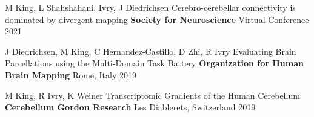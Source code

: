 \begin{cventries}

  \cventry
    {M King, L Shahshahani, Ivry, J Diedrichsen} %
    {Cerebro-cerebellar connectivity is dominated by divergent mapping} %
    {\textbf{Society for Neuroscience}} %
    {Virtual Conference} %
    {2021} %


  \cventry
    {J Diedrichsen, M King, C Hernandez-Castillo, D Zhi, R Ivry} %
    {Evaluating Brain Parcellations using the Multi-Domain Task Battery} %
    {\textbf{Organization for Human Brain Mapping}} %
    {Rome, Italy} %
    {2019} %
    
    
  \cventry
    {M King, R Ivry, K Weiner} %
    {Transcriptomic Gradients of the Human Cerebellum} %
    {\textbf{Cerebellum Gordon Research}} %
    {Les Diablerets, Switzerland} %
    {2019} %
    

    

\end{cventries}
